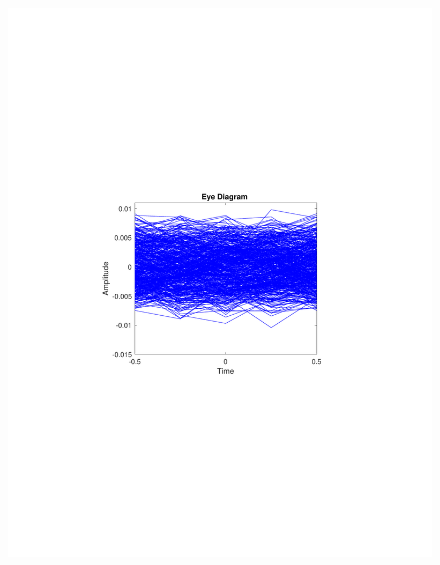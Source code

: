 \begin{refsection}
\begin{figure}[H]
\begin{minipage}{0.30\textwidth}
		\includegraphics[clip, trim=4cm 8cm 4cm 8cm, width=1\textwidth]{./sdf/m_qam_system/figures/expResults/homodyne/0_eye_4GBdInSig13dBc_bfFec.pdf}
		\label{fig:4GBdSpecBefFecHm}
	\end{minipage}
	\begin{minipage}{0.30\textwidth}
		\centering

\end{minipage}
\end{figure}
\end{refsection}
